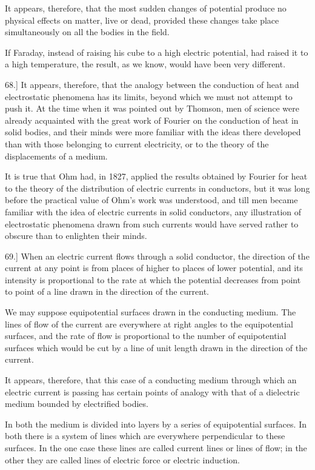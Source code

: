 \documentclass[12pt,oneside]{book}[2021/10/04]
\newcommand{\Runhead}[1]{\fancyhead[C]{\iffloatpage{}{\small#1}}}
\newcommand{\article}[1]{\phantomsection \label{art:#1}{#1.]}}
\newcommand{\¬}{\hphantom{0}}
\begin{document}
It appears, therefore, that the most sudden changes of potential
produce no physical effects on matter, live or dead, provided these
changes take place simultaneously on all the bodies in the field.

If Faraday, instead of raising his cube to a high electric potential,
had raised it to a high temperature, the result, as we know, would
have been very different.
\Runhead{FARADAY'S CUBE.}

\article{68} It appears, therefore, that the analogy between the conduction
of heat and electrostatic phenomena has its limits, beyond
which we must not attempt to push it. At the time when it was
pointed out by Thomson, men of science were already acquainted
with the great work of Fourier on the conduction of heat in solid
bodies, and their minds were more familiar with the ideas there
developed than with those belonging to current electricity, or to
the theory of the displacements of a medium.

It is true that Ohm had, in 1827, applied the results obtained
by Fourier for heat to the theory of the distribution of electric
currents in conductors, but it was long before the practical value
of Ohm's work was understood, and till men became familiar with
the idea of electric currents in solid conductors, any illustration of
electrostatic phenomena drawn from such currents would have served
rather to obscure than to enlighten their minds.

\article{69} When an electric current flows through a solid conductor,
the direction of the current at any point is from places of higher
to places of lower potential, and its intensity is proportional to the
rate at which the potential decreases from point to point of a line
drawn in the direction of the current.
\Runhead{CURRENT.}

We may suppose equipotential surfaces drawn in the conducting
medium. The lines of flow of the current are everywhere at right
angles to the equipotential surfaces, and the rate of flow is proportional
to the number of equipotential surfaces which would be
cut by a line of unit length drawn in the direction of the current.

It appears, therefore, that this case of a conducting medium
through which an electric current is passing has certain points
of analogy with that of a dielectric medium bounded by electrified
bodies.

In both the medium is divided into layers by a series of equipotential
surfaces. In both there is a system of lines which are
everywhere perpendicular to these surfaces. In the one case these
lines are called current lines or lines of flow; in the other they
are called lines of electric force or electric induction.
\end{document}
